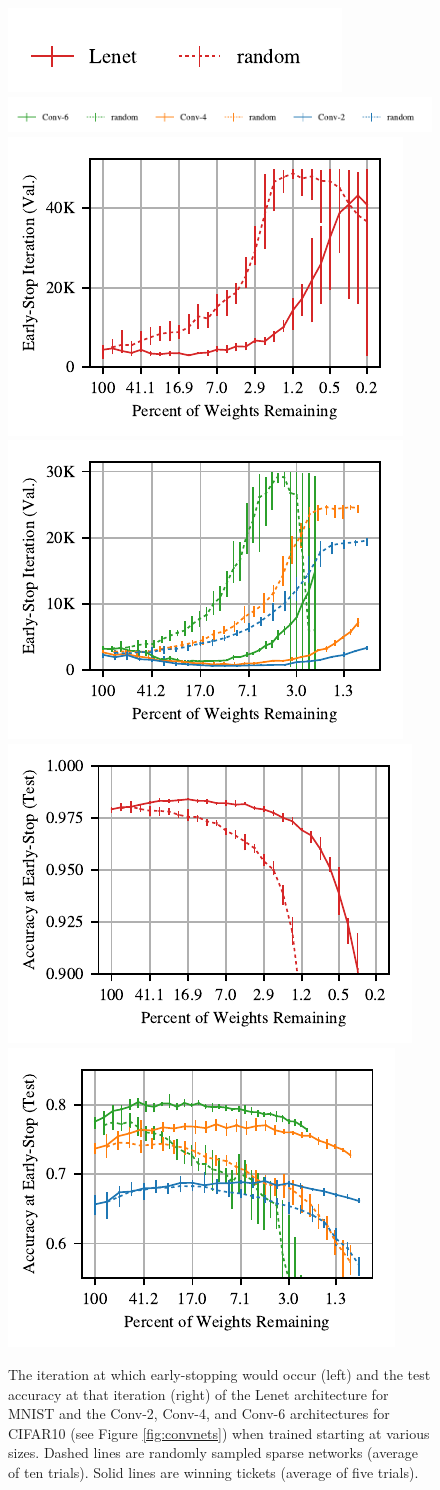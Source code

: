 \begin{figure}
\centering
\includegraphics[width=.19\textwidth]{graphs/mnist/lenet/random/legend}\includegraphics[width=.6\textwidth]{graphs/mnist/lenet/random2/legend}%
\vspace{-1em}
\includegraphics[width=.25\textwidth]{graphs/mnist/lenet/random/iteration}%
\includegraphics[width=.25\textwidth]{graphs/mnist/lenet/random2/iteration}%
\includegraphics[width=.25\textwidth]{graphs/mnist/lenet/random/accuracy}%
\includegraphics[width=.25\textwidth]{graphs/mnist/lenet/random2/accuracy}

\caption{The iteration at which early-stopping would occur (left)
and the test accuracy at that iteration (right) of the Lenet architecture for MNIST and the Conv-2, Conv-4, and Conv-6
architectures for CIFAR10 (see Figure \ref{fig:convnets}) when trained starting at various sizes. Dashed lines are randomly sampled sparse networks
(average of ten trials).
Solid lines are winning tickets (average of five trials).}
\label{fig:random}
\end{figure}

